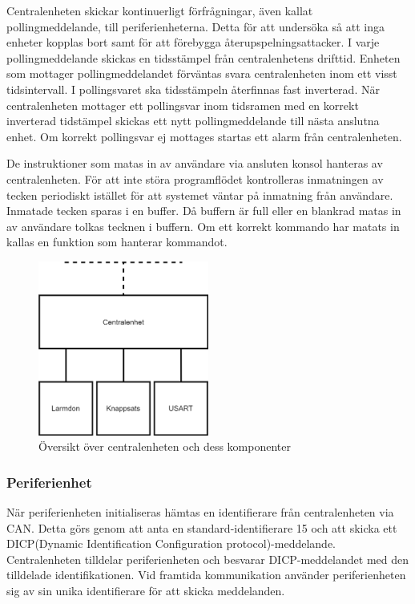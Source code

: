\documentclass[a4paper]{article}
\begin{document}
Centralenheten skickar kontinuerligt förfrågningar, även kallat pollingmeddelande, till periferienheterna.
Detta för att undersöka så att inga enheter kopplas bort samt för att förebygga återupspelningsattacker.
I varje pollingmeddelande skickas en tidsstämpel från centralenhetens drifttid.
Enheten som mottager pollingmeddelandet förväntas svara centralenheten inom ett visst tidsintervall.
I pollingsvaret ska tidsstämpeln återfinnas fast inverterad.
När centralenheten mottager ett pollingsvar inom tidsramen med en korrekt inverterad tidstämpel skickas ett nytt pollingmeddelande till nästa anslutna enhet.
Om korrekt pollingsvar ej mottages startas ett alarm från centralenheten.

De instruktioner som matas in av användare via ansluten konsol hanteras av centralenheten.
För att inte störa programflödet kontrolleras inmatningen av tecken periodiskt istället för att systemet väntar på inmatning från användare.
Inmatade tecken sparas i en buffer.
Då buffern är full eller en blankrad matas in av användare tolkas tecknen i buffern.
Om ett korrekt kommando har matats in kallas en funktion som hanterar kommandot.

\begin{figure}[H]
    \centering
    \includegraphics[width=0.5\textwidth]{central-oversikt-pp.png}
    \caption{Översikt över centralenheten och dess komponenter}
\end{figure}


\subsubsection{Periferienhet}
När periferienheten initialiseras hämtas en identifierare från centralenheten via CAN.
Detta görs genom att anta en standard-identifierare 15 och att skicka ett DICP(Dynamic Identification Configuration protocol)-meddelande.
Centralenheten tilldelar periferienheten och besvarar DICP-meddelandet med den tilldelade identifikationen.
Vid framtida kommunikation använder periferienheten sig av sin unika identifierare för att skicka meddelanden.
\end{document}
